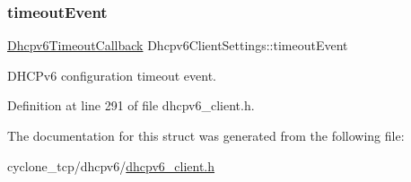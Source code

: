 \mbox{\label{structDhcpv6ClientSettings_a8ff0d3224eec61ef47ae19eccb8b0026}} 
\subsubsection{\texorpdfstring{timeout\+Event}{timeoutEvent}}
{\footnotesize\ttfamily \hyperlink{dhcpv6__client_8h_afa288458e5e628c6f13cd8823bd8a559}{Dhcpv6\+Timeout\+Callback} Dhcpv6\+Client\+Settings\+::timeout\+Event}



D\+H\+C\+Pv6 configuration timeout event. 



Definition at line 291 of file dhcpv6\+\_\+client.\+h.



The documentation for this struct was generated from the following file\+:\begin{DoxyCompactItemize}
\item 
cyclone\+\_\+tcp/dhcpv6/\hyperlink{dhcpv6__client_8h}{dhcpv6\+\_\+client.\+h}\end{DoxyCompactItemize}
